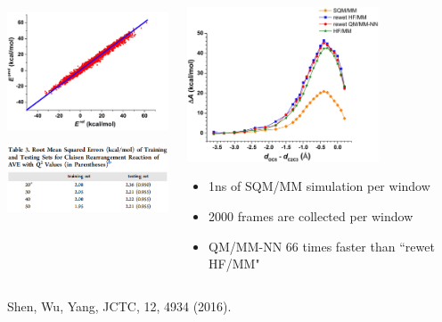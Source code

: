 \documentclass[handout]{beamer} %
\begin{document}
\begin{frame}
\begin{columns}
\begin{column}{0.5\textwidth}
\begin{center}
\includegraphics[height=1.5in]{figures_ml/weitao_claisen_scatter.png}  \\
\includegraphics[height=0.9in]{figures_ml/weitao_claisen_rms.png}
\end{center} 
\end{column}
\begin{column}{0.5\textwidth}
\begin{center}
\includegraphics[height=1.8in]{figures_ml/weitao_claisen_profile.png} 
\begin{itemize}
\item \scriptsize{1ns of SQM/MM simulation per window}
\item 2000 frames are collected per window
\item QM/MM-NN 66 times faster than ``rewet HF/MM"
\end{itemize}
\end{center}
\end{column}
\end{columns}
\vspace{10mm}
\begin{center}
\footnotesize{Shen, Wu, Yang, JCTC, 12, 4934 (2016).}
\end{center} 
\end{frame}
\end{document}
